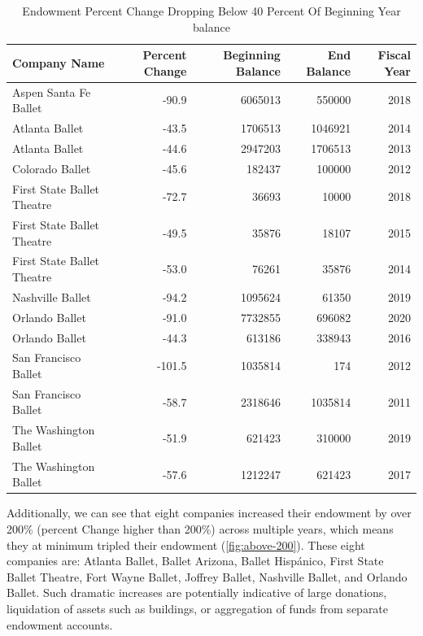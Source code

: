 \documentclass[Dance Data
Project,article,submit,moreauthors,pdftex]{mdpi}
\begin{document}
\begin{table}[!h]

\caption{Endowment Percent Change Dropping Below 40 Percent Of Beginning Year balance}
\centering
\begin{tabular}[t]{lrrrr}
\toprule
Company Name & Percent Change & Beginning Balance & End Balance & Fiscal Year\\
\midrule
Aspen Santa Fe Ballet & -90.9 & 6065013 & 550000 & 2018\\
\addlinespace
Atlanta Ballet & -43.5 & 1706513 & 1046921 & 2014\\
\addlinespace
Atlanta Ballet & -44.6 & 2947203 & 1706513 & 2013\\
\addlinespace
Colorado Ballet & -45.6 & 182437 & 100000 & 2012\\
\addlinespace
First State Ballet Theatre & -72.7 & 36693 & 10000 & 2018\\
\addlinespace
First State Ballet Theatre & -49.5 & 35876 & 18107 & 2015\\
\addlinespace
First State Ballet Theatre & -53.0 & 76261 & 35876 & 2014\\
\addlinespace
Nashville Ballet & -94.2 & 1095624 & 61350 & 2019\\
\addlinespace
Orlando Ballet & -91.0 & 7732855 & 696082 & 2020\\
\addlinespace
Orlando Ballet & -44.3 & 613186 & 338943 & 2016\\
\addlinespace
San Francisco Ballet & -101.5 & 1035814 & 174 & 2012\\
\addlinespace
San Francisco Ballet & -58.7 & 2318646 & 1035814 & 2011\\
\addlinespace
The Washington Ballet & -51.9 & 621423 & 310000 & 2019\\
\addlinespace
The Washington Ballet & -57.6 & 1212247 & 621423 & 2017\\
\bottomrule
\end{tabular}
\end{table}

Additionally, we can see that eight companies increased their endowment
by over 200\% (percent Change higher than 200\%) across multiple years,
which means they at minimum tripled their endowment
(\ref{fig:above-200}). These eight companies are: Atlanta Ballet, Ballet
Arizona, Ballet Hispánico, First State Ballet Theatre, Fort Wayne
Ballet, Joffrey Ballet, Nashville Ballet, and Orlando Ballet. Such
dramatic increases are potentially indicative of large donations,
liquidation of assets such as buildings, or aggregation of funds from
separate endowment accounts.
\end{document}
